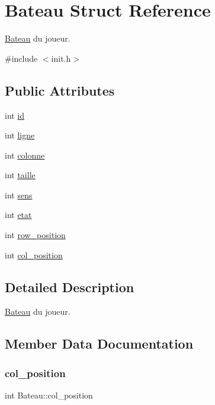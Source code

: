 \hypertarget{structBateau}{}\section{Bateau Struct Reference}
\label{structBateau}


\hyperlink{structBateau}{Bateau} du joueur.  




{\ttfamily \#include $<$init.\+h$>$}

\subsection*{Public Attributes}
\begin{DoxyCompactItemize}
\item 
int \hyperlink{structBateau_afc8b5863d722d86e00511dcae976220d}{id}
\item 
int \hyperlink{structBateau_ae8d7a76573b9e27c1e72a15832b9d6f3}{ligne}
\item 
int \hyperlink{structBateau_abbe487a77be892bdf087c1b146c957d6}{colonne}
\item 
int \hyperlink{structBateau_a1dd818ea44eed67f756400eaac344a95}{taille}
\item 
int \hyperlink{structBateau_a887a8ad2ee59ffd987eb5f9d117e83a2}{sens}
\item 
int \hyperlink{structBateau_a43f12f415c28f4dbd4f28808b9fc1e51}{etat}
\item 
int \hyperlink{structBateau_a0a2dce9cb58a40ad57f86944daf90bd8}{row\+\_\+position}
\item 
int \hyperlink{structBateau_a54fc283dfadc64d7e665cd4bfa98ca76}{col\+\_\+position}
\end{DoxyCompactItemize}


\subsection{Detailed Description}
\hyperlink{structBateau}{Bateau} du joueur. 

\subsection{Member Data Documentation}
\hypertarget{structBateau_a54fc283dfadc64d7e665cd4bfa98ca76}{}\label{structBateau_a54fc283dfadc64d7e665cd4bfa98ca76} 
\subsubsection{\texorpdfstring{col\+\_\+position}{col\_position}}
{\footnotesize\ttfamily int Bateau\+::col\+\_\+position}

